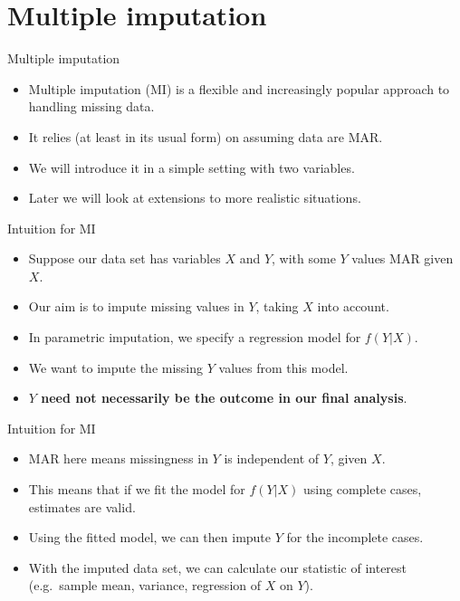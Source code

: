 \documentclass[ignorenonframetext,]{beamer}
\providecommand{\tightlist}{%
  \setlength{\itemsep}{0pt}\setlength{\parskip}{0pt}}
\begin{document}
\hypertarget{multiple-imputation}{%
\section{Multiple imputation}\label{multiple-imputation}}

\begin{frame}{Multiple imputation}
\protect\hypertarget{multiple-imputation-1}{}

\begin{itemize}
\tightlist
\item
  Multiple imputation (MI) is a flexible and increasingly popular
  approach to handling missing data.
\item
  It relies (at least in its usual form) on assuming data are MAR.
\item
  We will introduce it in a simple setting with two variables.
\item
  Later we will look at extensions to more realistic situations.
\end{itemize}

\end{frame}

\begin{frame}{Intuition for MI}
\protect\hypertarget{intuition-for-mi}{}

\begin{itemize}
\tightlist
\item
  Suppose our data set has variables \(X\) and \(Y\), with some \(Y\)
  values MAR given \(X\).
\item
  Our aim is to impute missing values in \(Y\), taking \(X\) into
  account.
\item
  In parametric imputation, we specify a regression model for
  \(f(Y|X)\).
\item
  We want to impute the missing \(Y\) values from this model.
\item
  \textbf{$Y$ need not necessarily be the outcome in our final analysis}.
\end{itemize}

\end{frame}

\begin{frame}{Intuition for MI}
\protect\hypertarget{intuition-for-mi-1}{}

\begin{itemize}
\tightlist
\item
  MAR here means missingness in \(Y\) is independent of \(Y\), given
  \(X\).
\item
  This means that if we fit the model for \(f(Y|X)\) using complete
  cases, estimates are valid.
\item
  Using the fitted model, we can then impute \(Y\) for the incomplete
  cases.
\item
  With the imputed data set, we can calculate our statistic of interest
  (e.g.~sample mean, variance, regression of \(X\) on \(Y\)).
\end{itemize}

\end{frame}
\end{document}
